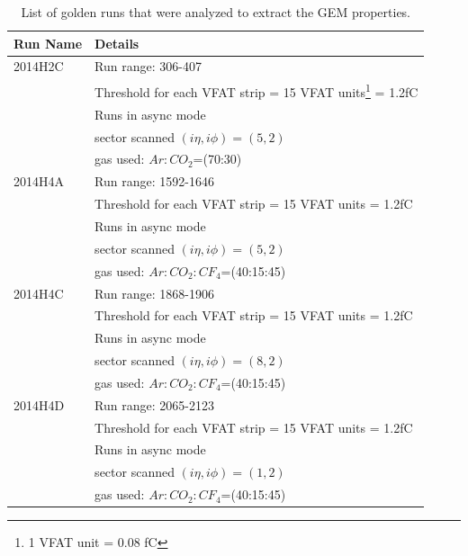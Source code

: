\begin{table}
\begin{tabular}[!htbp]{l l}
\hline
\textbf{Run Name}   &   \textbf{Details}\\
\hline
2014H2C     & Run range: 306-407    \\
            & Threshold for each VFAT strip = 15 VFAT units\footnote{1 VFAT unit = 0.08 fC} = 1.2fC\\
            & Runs in async mode \\
            & sector scanned $(i\eta, i\phi)=(5,2)$\\
            & gas used: $Ar:CO_{2}$=(70:30)\\
\hline
2014H4A     & Run range: 1592-1646 \\
            & Threshold for each VFAT strip = 15 VFAT units = 1.2fC\\
            & Runs in async mode \\
            & sector scanned $(i\eta, i\phi)=(5,2)$\\
            & gas used: $Ar:CO_{2}:CF_4$=(40:15:45)\\
\hline
2014H4C     & Run range: 1868-1906 \\
            & Threshold for each VFAT strip = 15 VFAT units = 1.2fC\\
            & Runs in async mode \\
            & sector scanned $(i\eta, i\phi)=(8,2)$\\
            & gas used: $Ar:CO_{2}:CF_4$=(40:15:45)\\
\hline
2014H4D     & Run range: 2065-2123 \\
            & Threshold for each VFAT strip = 15 VFAT units = 1.2fC\\
            & Runs in async mode \\
            & sector scanned $(i\eta, i\phi)=(1,2)$\\             
            & gas used: $Ar:CO_{2}:CF_4$=(40:15:45)\\
\hline
\end{tabular}
\caption{List of golden runs that were analyzed to extract the GEM properties.}
\label{tab:gemTBgoldenruns}
\end{table}

